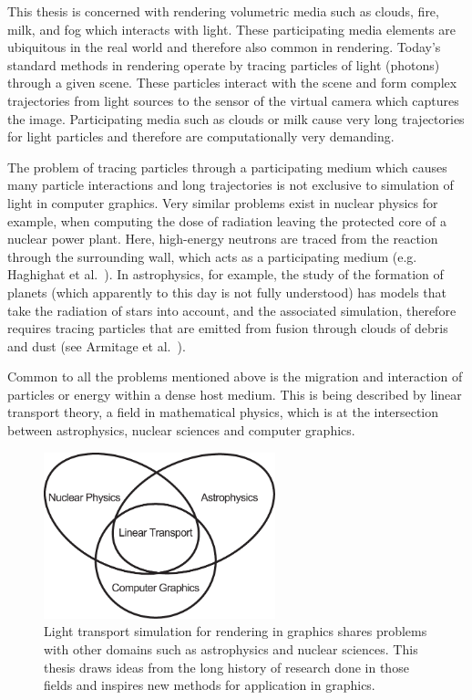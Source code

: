 This thesis is concerned with rendering volumetric media such as clouds, fire, milk, and fog which interacts with light. These participating media elements are ubiquitous in the real world and therefore also common in rendering. Today's standard methods in rendering operate by tracing particles of light (photons) through a given scene. These particles interact with the scene and form complex trajectories from light sources to the sensor of the virtual camera which captures the image. Participating media such as clouds or milk cause very long trajectories for light particles and therefore are computationally very demanding.


The problem of tracing particles through a participating medium which causes many particle interactions and long trajectories is not exclusive to simulation of light in computer graphics. Very similar problems exist in nuclear physics for example, when computing the dose of radiation leaving the protected core of a nuclear power plant. Here, high-energy neutrons are traced from the reaction through the surrounding wall, which acts as a participating medium (e.g. Haghighat et al.~\cite{Haghighat03}). In astrophysics, for example, the study of the formation of planets (which apparently to this day is not fully understood) has models that take the radiation of stars into account, and the associated simulation, therefore requires tracing particles that are emitted from fusion through clouds of debris and dust (see Armitage et al.~\cite{Armitage11}).

Common to all the problems mentioned above is the migration and interaction of particles or energy within a dense host medium. This is being described by linear transport theory, a field in mathematical physics, which is at the intersection between astrophysics, nuclear sciences and computer graphics.
\begin{figure}[ht]
\centering
\includegraphics[width=0.6\textwidth]{02_Introduction/figures/fig_linear_transport.pdf}
\caption{Light transport simulation for rendering in graphics shares problems with other domains such as astrophysics and nuclear sciences. This thesis draws ideas from the long history of research done in those fields and inspires new methods for application in graphics.}
\label{fig:intro_linear_transport_fields}
\end{figure}

